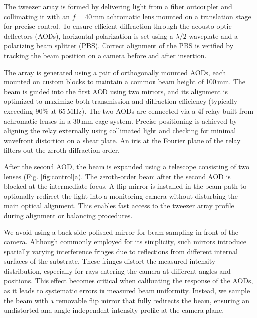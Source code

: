 The tweezer array is formed by delivering light from a fiber outcoupler and collimating it with an $f = 40\,\mathrm{mm}$ achromatic lens mounted on a translation stage for precise control. To ensure efficient diffraction through the acousto-optic deflectors (AODs), horizontal polarization is set using a $\lambda/2$ waveplate and a polarizing beam splitter (PBS). Correct alignment of the PBS is verified by tracking the beam position on a camera before and after insertion.

The array is generated using a pair of orthogonally mounted AODs, each mounted on custom blocks to maintain a common beam height of 100\,mm. The beam is guided into the first AOD using two mirrors, and its alignment is optimized to maximize both transmission and diffraction efficiency (typically exceeding 90\% at 65\,MHz). The two AODs are connected via a 4f relay built from achromatic lenses in a 30\,mm cage system. Precise positioning is achieved by aligning the relay externally using collimated light and checking for minimal wavefront distortion on a shear plate. An iris at the Fourier plane of the relay filters out the zeroth diffraction order.

After the second AOD, the beam is expanded using a telescope consisting of two lenses (Fig. \ref{fig:control}a). 
The zeroth-order beam after the second AOD is blocked at the intermediate focus.
A flip mirror is installed in the beam path to optionally redirect the light into a monitoring camera without disturbing the main optical alignment. This enables fast access to the tweezer array profile during alignment or balancing procedures.

We avoid using a back-side polished mirror for beam sampling in front of the camera. Although commonly employed for its simplicity, such mirrors introduce spatially varying interference fringes due to reflections from different internal surfaces of the substrate. These fringes distort the measured intensity distribution, especially for rays entering the camera at different angles and positions. This effect becomes critical when calibrating the response of the AODs, as it leads to systematic errors in measured beam uniformity. Instead, we sample the beam with a removable flip mirror that fully redirects the beam, ensuring an undistorted and angle-independent intensity profile at the camera plane.



